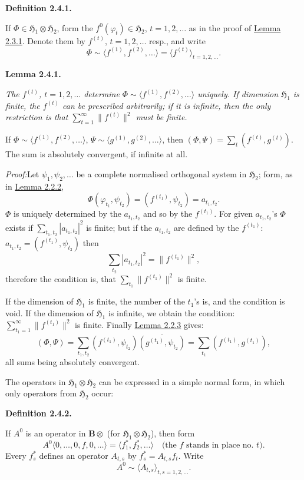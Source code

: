 \documentclass[12pt,b5paper,twoside]{article}
\newcommand{\Hspace}{\mathfrak H}
\newcommand{\B}{\mathbf B}
\newcommand{\Definition}[1]{%
  \par\smallskip\noindent\phantomsection\label{def:#1}\textbf{Definition #1.}\enspace
}
\newcommand{\Lemma}[1]{%
  \par\smallskip\noindent\phantomsection\label{lem:#1}\textbf{Lemma #1.}\enspace
}
\newcommand{\Proof}{\par\noindent\textit{Proof:}\enspace}
\newcommand{\lemref}[1]{\hyperref[lem:#1]{Lemma #1}}
\begin{document}
\Definition{2.4.1}
If $\Phi\in\Hspace_1\otimes\Hspace_2$, form the
$f^0(\varphi_t)\in\Hspace_2$, $t=1,2,\ldots$ as in the proof of
\lemref{2.3.1}. Denote them by $f^{(t)}$, $t=1,2,\ldots$ resp., and write
\[
 \Phi\sim\langle f^{(1)},f^{(2)},\ldots\rangle
       =\langle f^{(t)}\rangle_{t=1,2,\ldots}.
\]

\Lemma{2.4.1}
{\itshape
The $f^{(t)}$, $t=1,2,\ldots$ determine
$\Phi\sim\langle f^{(1)},f^{(2)},\ldots\rangle$ uniquely. If dimension
$\Hspace_1$ is finite, the $f^{(t)}$ can be prescribed arbitrarily; if it is
infinite, then the only restriction is that
$\sum_{t=1}^{\infty}\lVert f^{(t)}\rVert^2$ must be finite.

If $\Phi\sim\langle f^{(1)},f^{(2)},\ldots\rangle$,
$\Psi\sim\langle g^{(1)},g^{(2)},\ldots\rangle$, then
$(\Phi,\Psi)=\sum_t(f^{(t)},g^{(t)})$. The sum is absolutely convergent, if
infinite at all.}

\Proof Let $\psi_1,\psi_2,\ldots$ be a complete normalised orthogonal system
in $\Hspace_2$; form, as in \lemref{2.2.2},
\[
 \Phi(\varphi_{t_1},\psi_{t_2})=(f^{(t_1)},\psi_{t_2})=a_{t_1,t_2}.
\]
$\Phi$ is uniquely determined by the $a_{t_1,t_2}$ and so by the
$f^{(t_1)}$. For given $a_{t_1,t_2}$'s $\Phi$ exists if
$\sum_{t_1,t_2}|a_{t_1,t_2}|^2$ is finite; but if the $a_{t_1,t_2}$ are
defined by the $f^{(t_1)}$: $a_{t_1,t_2}=(f^{(t_1)},\psi_{t_2})$ then
\[
 \sum_{t_2}|a_{t_1,t_2}|^2=\lVert f^{(t_1)}\rVert^2,
\]
therefore the condition is, that
$\sum_{t_1}\lVert f^{(t_1)}\rVert^2$ is finite.

If the dimension of $\Hspace_1$ is finite, the number of the $t_1$'s is, and
the condition is void. If the dimension of $\Hspace_1$ is infinite, we obtain
the condition: $\sum_{t_1=1}^{\infty}\lVert f^{(t_1)}\rVert^2$ is finite.
Finally \lemref{2.2.3} gives:
\[
 (\Phi,\Psi)
 =\sum_{t_1,t_2}(f^{(t_1)},\psi_{t_2})
       \overline{(g^{(t_1)},\psi_{t_2})}
 =\sum_{t_1}(f^{(t_1)},g^{(t_1)}),
\]
all sums being absolutely convergent.

The operators in $\Hspace_1\otimes\Hspace_2$ can be expressed in a simple
normal form, in which only operators from $\Hspace_2$ occur:

\Definition{2.4.2}
If $A^0$ is an operator in $\B\otimes$ (for
$\Hspace_1\otimes\Hspace_2$), then form
\[
 A^0\langle0,\ldots,0,f,0,\ldots\rangle
 =\langle f_1^*,f_2^*,\ldots\rangle
 \quad\text{(the $f$ stands in place no. $t$)}.
\]
Every $f_s^*$ defines an operator $A_{t,s}$ by
$f_s^*=A_{t,s}f_t$. Write
\[
 A^0\sim\langle A_{t,s}\rangle_{t,s=1,2,\ldots}.
\]
\end{document}
